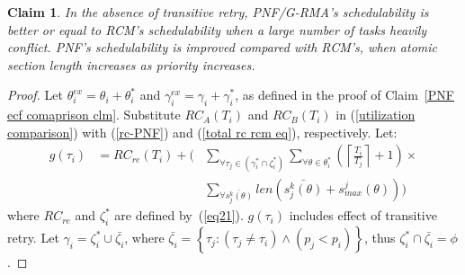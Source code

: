 \documentclass[a4paper,english]{article}
\newtheorem{clm}{Claim}
\newtheorem{proof}{Proof}
\begin{document}
\begin{clm}\label{clm_pnf_rcm_comp}
In the absence of transitive retry, PNF/G-RMA's schedulability is better or equal to RCM's schedulability when a large number of tasks heavily conflict. PNF's schedulability is improved compared with RCM's, when atomic section length increases as priority increases. 
\end{clm}
\begin{proof}\normalfont
Let $\theta_{i}^{ex}=\theta_{i}+\theta_{i}^{*}$ and $\gamma_{i}^{ex}=\gamma_{i}+\gamma_{i}^{*}$, as defined in the proof of Claim~\ref{PNF ecf comaprison clm}. Substitute $RC_{A}(T_{i})$ and $RC_{B}(T_{i})$ in (\ref{utilization comparison}) with (\ref{rc-PNF}) and (\ref{total rc rcm eq}), respectively. Let: 
% 
\begin{eqnarray*}
g(\tau_{i}) & =RC_{re}(T_{i})+\Bigg( & \sum_{\forall\tau_{j}\in(\gamma_{i}^{*}\cap\zeta_{i}^{*})}\sum_{\forall\theta\in\theta_{i}^{*}}\left(\left\lceil \frac{T_{i}}{T_{j}}\right\rceil +1\right)\times\\
 &  & \sum_{\forall\bar{s_{j}^{k}(\theta)}}len\left(\bar{s_{j}^{k}(\theta)}+s_{max}^{j}(\theta)\right)\Bigg)
\end{eqnarray*}
%
where $RC_{re}$ and $\zeta_i^*$ are defined by~(\ref{eq21}). $g(\tau_i)$ includes effect of transitive retry. 
Let $\gamma_{i}=\zeta_{i}^{*}\cup\bar{\zeta_{i}}$, where $\bar{\zeta_{i}}=\left\{ \tau_{j}:\left(\tau_{j}\ne\tau_{i}\right)\wedge\left(p_{j}<p_{i}\right)\right\} $,
thus $\zeta_{i}^{*}\cap\bar{\zeta_{i}}=\phi$.


\end{proof}
\end{document}
